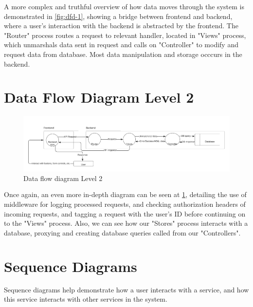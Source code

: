 \documentclass[a4paper,11pt]{report}
\begin{document}
A more complex and truthful overview of how data moves through the system is
demonstrated in \ref{fig:dfd-1}, showing a bridge between frontend and backend,
where a user's interaction with the backend is abstracted by the frontend. The
"Router" process routes a request to relevant handler, located in "Views"
process, which unmarshals data sent in request and calls on "Controller" to
modify and request data from database. Most data manipulation and storage
occcurs in the backend.

\section{Data Flow Diagram Level 2}
\begin{figure}[h]
    \centering
    \includegraphics[width=\textwidth]{d2-dfd-2.png}
    \caption{Data flow diagram Level 2}
    \label{fig:dfd-2}
\end{figure}

Once again, an even more in-depth diagram can be seen at \ref{fig:dfd-2},
detailing the use of middleware for logging processed requests, and checking
authorization headers of incoming requests, and tagging a request with the
user's ID before continuing on to the "Views" process. Also, we can see how our
"Stores" process interacts with a database, proxying and creating database
queries called from our "Controllers".

\newpage
\section{Sequence Diagrams}
Sequence diagrams help demonstrate how a user interacts with a service, and how
this service interacts with other services in the system.
\end{document}
